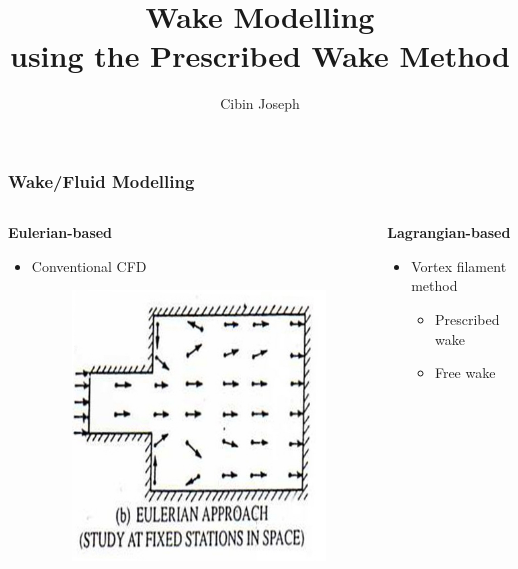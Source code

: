 \documentclass[11pt]{beamer}
\begin{document}
	\author{Cibin Joseph}
	\title{Wake Modelling\\ using the Prescribed Wake Method}
	\begin{frame}[plain]
	\maketitle
\end{frame}

\begin{frame}[t]
\frametitle{Wake/Fluid Modelling}
\begin{columns}[t]
	\begin{column}{0.5\textwidth}
		\textbf{Eulerian-based}
		\begin{itemize}
			\item Conventional CFD
			\vspace{2.2cm}
			\begin{figure}
				\includegraphics[scale=0.4]{Euler.jpg}
			\end{figure}
		\end{itemize}
	\end{column}
	\begin{column}{0.5\textwidth}
		\textbf{Lagrangian-based}
		\begin{itemize}
			\item Vortex filament method
			\begin{itemize}
			\item \alert{Prescribed wake}
			\item Free wake

\end{itemize}
\end{itemize}
\end{column}
\end{columns}
\end{frame}
\end{document}
